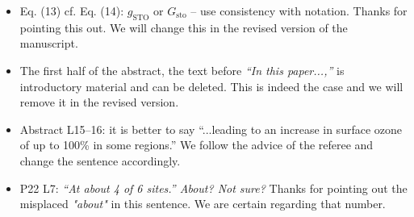 \documentclass{scrartcl}
\begin{document}
\begin{itemize}
\item {\color{blue}  Eq. (13) cf. Eq. (14): $g_\mathrm{STO}$ or $G_\mathrm{sto}$ -- use consistency with notation.}
  Thanks for pointing this out. We will change this in the revised version of the manuscript.
  
\item {\color{blue}  The first half of the abstract, the text before \emph{“In this paper...,”} is introductory
  material and can be deleted.}
  This is indeed the case and we will remove it in the revised version.
  
\item {\color{blue}  Abstract L15--16: it is better to say “...leading to an increase in surface
  ozone of up to 100\% in some regions.”}
  We follow the advice of the referee and change the sentence accordingly.
  
\item {\color{blue}  P22 L7: \emph{“At about 4 of 6 sites.” About? Not sure?}}
  Thanks for pointing out the misplaced \emph{"about"} in this sentence. We are certain regarding that number. 
  
\end{itemize}
\newpage
\end{document}
